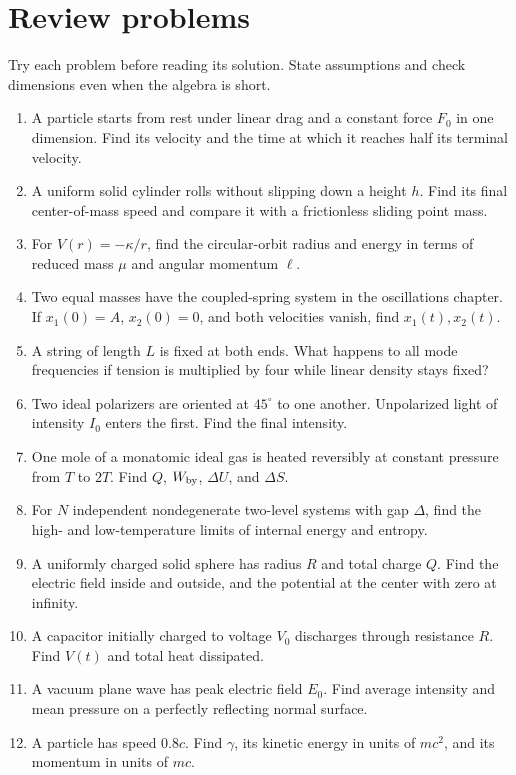 \documentclass[11pt,oneside]{book}
\theoremstyle{reviewstyle}
\begin{document}
\chapter{Review problems}
Try each problem before reading its solution. State assumptions and check dimensions even when the algebra is short.
\begin{enumerate}
\item A particle starts from rest under linear drag and a constant force $F_0$ in one dimension. Find its velocity and the time at which it reaches half its terminal velocity.
\item A uniform solid cylinder rolls without slipping down a height $h$. Find its final center-of-mass speed and compare it with a frictionless sliding point mass.
\item For $V(r)=-\kappa/r$, find the circular-orbit radius and energy in terms of reduced mass $\mu$ and angular momentum $\ell$.
\item Two equal masses have the coupled-spring system in the oscillations chapter. If $x_1(0)=A$, $x_2(0)=0$, and both velocities vanish, find $x_1(t),x_2(t)$.
\item A string of length $L$ is fixed at both ends. What happens to all mode frequencies if tension is multiplied by four while linear density stays fixed?
\item Two ideal polarizers are oriented at $45^\circ$ to one another. Unpolarized light of intensity $I_0$ enters the first. Find the final intensity.
\item One mole of a monatomic ideal gas is heated reversibly at constant pressure from $T$ to $2T$. Find $Q$, $W_{\rm by}$, $\Delta U$, and $\Delta S$.
\item For $N$ independent nondegenerate two-level systems with gap $\Delta$, find the high- and low-temperature limits of internal energy and entropy.
\item A uniformly charged solid sphere has radius $R$ and total charge $Q$. Find the electric field inside and outside, and the potential at the center with zero at infinity.
\item A capacitor initially charged to voltage $V_0$ discharges through resistance $R$. Find $V(t)$ and total heat dissipated.
\item A vacuum plane wave has peak electric field $E_0$. Find average intensity and mean pressure on a perfectly reflecting normal surface.
\item A particle has speed $0.8c$. Find $\gamma$, its kinetic energy in units of $mc^2$, and its momentum in units of $mc$.

\end{enumerate}
\end{document}

